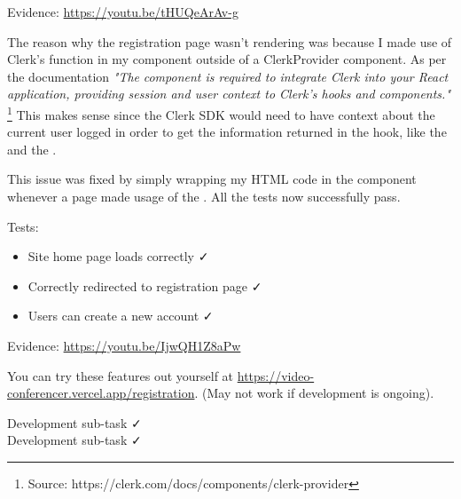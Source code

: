 {\sffamily Evidence: \url{https://youtu.be/tHUQeArAv-g}}

{\color{gray} \hrulefill}
\vspace{0.2cm}

The reason why the registration page wasn't rendering was because
I made use of Clerk's  function in my 
 component outside of a ClerkProvider component.
As per the documentation \textit{"The} 
 \textit{component is required to integrate
Clerk into your React application, providing session and user
context to Clerk's hooks and components."} 
\footnote{Source: https://clerk.com/docs/components/clerk-provider}
This makes sense since
the Clerk SDK would need to have context about the current user
logged in order to get the information returned in the
 hook, like the  and the 
. \\ \vspace{0.2cm}

This issue was fixed by simply wrapping my HTML code in the 
 component whenever a page made usage of the
. All the tests now successfully pass. \\ \vspace{0.2cm}

{\sffamily Tests:}
\begin{itemize}
  \item Site home page loads correctly \faCheck \\
  \item Correctly redirected to registration page \faCheck \\
  \item Users can create a new account \faCheck \\
\end{itemize}

{\sffamily Evidence: \url{https://youtu.be/IjwQH1Z8aPw}}

{\color{gray} \hrulefill}
\vspace{0.2cm}

You can try these features out yourself at \url{https://video-conferencer.vercel.app/registration}.
(May not work if development is ongoing).\\ \vspace{0.2cm}

{\sffamily Development sub-task  \faCheck \\ \vspace{0.2cm}
Development sub-task  \faCheck } \\ \vspace{0.2cm}

